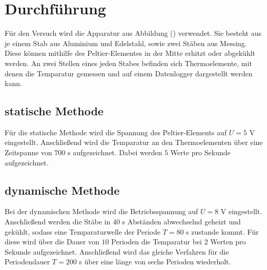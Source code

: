\section{Durchführung}
Für den Versuch wird die Apparatur aus Abbildung () verwendet. Sie besteht aus je einem Stab aus Aluminium und Edelstahl, sowie zwei Stäben aus Messing. Diese können mithilfe des Peltier-Elementes in der Mitte erhitzt oder abgekühlt werden. An zwei Stellen eines jeden Stabes befinden sich Thermoelemente, mit denen 
die Temparatur gemessen und auf einem Datenlogger dargestellt werden kann.
\subsection{statische Methode}
Für die statische Methode wird die Spannung des Peltier-Elements auf $U=5$ V eingestellt. Anschließend wird die Temparatur an den Thermoelementen über eine Zeitspanne von $700$ s aufgezeichnet. Dabei werden $5$ Werte pro Sekunde aufgezeichnet.
\subsection{dynamische Methode}
Bei der dynamischen Methode wird die Betriebsspannung auf $U=8$ V eingestellt. Anschließend werden die Stäbe in $40$ s Abständen abwechselnd geheizt und gekühlt, sodass eine Temparaturwelle der Periode $T=80$ s zustande kommt. Für diese wird über die Dauer von $10$ Perioden die Temparatur bei $2$ Werten pro Sekunde aufgezeichnet. Anschließend wird das gleiche Verfahren für die Periodendauer $T=200$ s über eine länge von sechs Perioden wiederholt.
